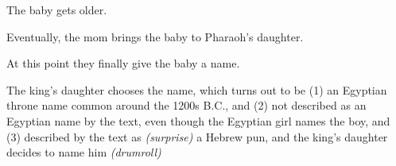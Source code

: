 {
}
{
}
{
	The baby gets older.

	Eventually, the mom brings the baby to Pharaoh's daughter.

	At this point they finally give the baby a name.

	The king's daughter chooses the name, which turns out
	to be (1) an Egyptian throne name common around
	the 1200s B.C., and (2) not described as an Egyptian
	name by the text, even though the Egyptian girl names
	the boy, and (3) described by the text as \textsl{(surprise)}
	a Hebrew pun, and the king's daughter decides
	to name him \textsl{(drumroll)}

	\begin{quote}


	\end{quote}

}

